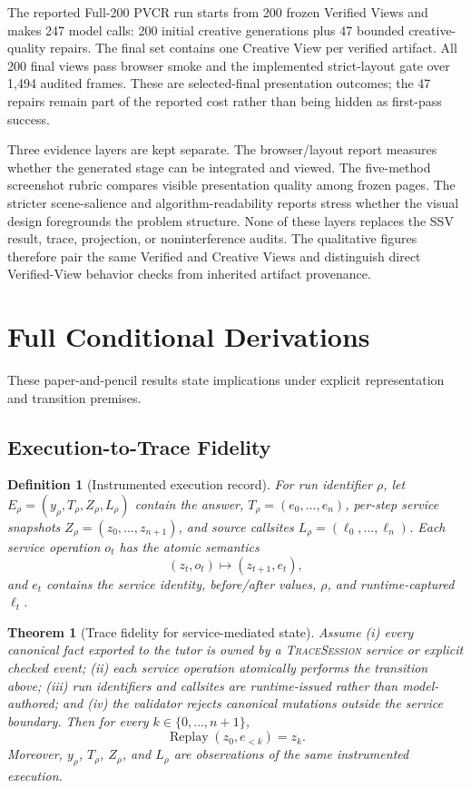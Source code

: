 \documentclass[letterpaper]{article}
\newcommand{\ssv}{\textsc{SSV}}
\newcommand{\pvcr}{\textsc{PVCR}}
\newtheorem{definition}{Definition}
\newtheorem{theorem}{Theorem}
\begin{document}
The reported Full-200 \pvcr{} run starts from 200 frozen Verified Views and makes 247 model calls: 200 initial creative generations plus 47 bounded creative-quality repairs. The final set contains one Creative View per verified artifact. All 200 final views pass browser smoke and the implemented strict-layout gate over 1,494 audited frames. These are selected-final presentation outcomes; the 47 repairs remain part of the reported cost rather than being hidden as first-pass success.

Three evidence layers are kept separate. The browser/layout report measures whether the generated stage can be integrated and viewed. The five-method screenshot rubric compares visible presentation quality among frozen pages. The stricter scene-salience and algorithm-readability reports stress whether the visual design foregrounds the problem structure. None of these layers replaces the \ssv{} result, trace, projection, or noninterference audits. The qualitative figures therefore pair the same Verified and Creative Views and distinguish direct Verified-View behavior checks from inherited artifact provenance.

\section{Full Conditional Derivations}

These paper-and-pencil results state implications under explicit representation and transition premises.

\subsection{Execution-to-Trace Fidelity}

\begin{definition}[Instrumented execution record]
For run identifier $\rho$, let
$E_\rho=(y_\rho,T_\rho,Z_\rho,L_\rho)$ contain the answer,
$T_\rho=(e_0,\ldots,e_n)$, per-step service snapshots
$Z_\rho=(z_0,\ldots,z_{n+1})$, and source callsites
$L_\rho=(\ell_0,\ldots,\ell_n)$. Each service operation $o_t$ has the
atomic semantics
\[
(z_t,o_t)\longmapsto(z_{t+1},e_t),
\]
and $e_t$ contains the service identity, before/after values, $\rho$,
and runtime-captured $\ell_t$.
\end{definition}

\begin{theorem}[Trace fidelity for service-mediated state]
Assume (i) every canonical fact exported to the tutor is owned by a
\textsc{TraceSession} service or explicit checked event; (ii) each
service operation atomically performs the transition above; (iii) run
identifiers and callsites are runtime-issued rather than model-authored;
and (iv) the validator rejects canonical mutations outside the service
boundary. Then for every $k\in\{0,\ldots,n+1\}$,
\[
\operatorname{Replay}(z_0,e_{<k})=z_k.
\]
Moreover, $y_\rho$, $T_\rho$, $Z_\rho$, and $L_\rho$ are observations
of the same instrumented execution.
\end{theorem}
\end{document}
